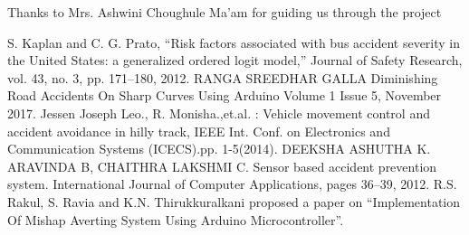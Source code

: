 \documentclass[conference]{IEEEtran}
\begin{document}
    Thanks to Mrs. Ashwini Choughule Ma'am for guiding us through the project


    \begin{thebibliography}{00}
         S. Kaplan and C. G. Prato, “Risk factors associated with bus accident severity in the United States: a generalized ordered logit model,” Journal of Safety
        Research, vol. 43, no. 3, pp. 171–180, 2012.
         RANGA SREEDHAR GALLA Diminishing Road Accidents On Sharp Curves Using Arduino Volume 1 Issue 5, November 2017.
         Jessen Joseph Leo., R. Monisha.,et.al. : Vehicle movement control and accident avoidance in hilly track, IEEE Int. Conf. on Electronics and Communication
        Systems (ICECS).pp. 1-5(2014).
         DEEKSHA ASHUTHA K. ARAVINDA B, CHAITHRA LAKSHMI C. Sensor based accident prevention system. International Journal of Computer
        Applications, pages 36–39, 2012.
         R.S. Rakul, S. Ravia and K.N. Thirukkuralkani proposed a paper on “Implementation Of
        Mishap Averting System Using Arduino Microcontroller”.
        \end{thebibliography}
\end{document}

